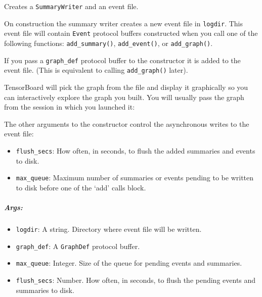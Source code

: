 Creates a \texttt{SummaryWriter} and an event file.

On construction the summary writer creates a new event file in
\texttt{logdir}. This event file will contain \texttt{Event} protocol
buffers constructed when you call one of the following functions:
\texttt{add\_summary()}, \texttt{add\_event()}, or
\texttt{add\_graph()}.

If you pass a \texttt{graph\_def} protocol buffer to the constructor it
is added to the event file. (This is equivalent to calling
\texttt{add\_graph()} later).

TensorBoard will pick the graph from the file and display it graphically
so you can interactively explore the graph you built. You will usually
pass the graph from the session in which you launched it:

\begin{Shaded}
\begin{Highlighting}[]
\OperatorTok{=} 
\OperatorTok{=} \OperatorTok{<}\OperatorTok{-}\OperatorTok{>}
\end{Highlighting}
\end{Shaded}

The other arguments to the constructor control the asynchronous writes
to the event file:

\begin{itemize}
\tightlist
\item
  \texttt{flush\_secs}: How often, in seconds, to flush the added
  summaries and events to disk.
\item
  \texttt{max\_queue}: Maximum number of summaries or events pending to
  be written to disk before one of the `add' calls block.
\end{itemize}

\subparagraph{Args: }\label{args-36}

\begin{itemize}
\tightlist
\item
  \texttt{logdir}: A string. Directory where event file will be written.
\item
  \texttt{graph\_def}: A \texttt{GraphDef} protocol buffer.
\item
  \texttt{max\_queue}: Integer. Size of the queue for pending events and
  summaries.
\item
  \texttt{flush\_secs}: Number. How often, in seconds, to flush the
  pending events and summaries to disk.
\end{itemize}

